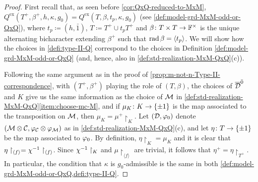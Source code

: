 \begin{proof}
    First recall that, as seen before \cref{cor:QxQ-reduced-to-MxM}, $Q^{\mathrm{ex}}(T^+, \beta^+, h, \kappa, g_0) = Q^{\mathrm{ex}} (T, \beta, t_p, \kappa, g_0)$ (see \cref{def:model-grd-MxM-odd-or-QxQ}), where $t_p \coloneqq (h, \bar 1)$, $T \coloneqq T^+ \cup t_p T^+$ and $\beta\colon T\times T \to \mathbb{F}^\times$ is the unique alternating bicharacter extending $\beta^+$ such that $\operatorname{rad} \beta = \langle t_p \rangle$. 
    We will show how the choices in \cref{defi:type-II-Q} correspond to the choices in Definition \ref{def:model-grd-MxM-odd-or-QxQ} (and, hence, also in \cref{def:std-realization-MxM-QxQ}(c)).
    
    Following the same argument as in the proof of \cref{prop:m-not-n-Type-II-correspondence}, with $(T^+, \beta^+)$ playing the role of $(T, \beta)$, the choices of $\barr \D\even$ and $K$ give us the same information as the choice of $\mathcal M$ in \cref{def:std-realization-MxM-QxQ}\eqref{item:choose-mc-M}, and if $\mu_K\colon K \to \{ \pm 1 \}$ is the map associated to the transposition on $\mathcal M$, then $\mu_K = \mu^+\restriction_K$. 
    Let $(\mathcal{D}, \varphi_0)$ denote $(\mathcal M \otimes \mathcal C, \varphi_{\mathcal C} \otimes \varphi_{\mathcal M})$ as in \cref{def:std-realization-MxM-QxQ}(c), and let
    $\eta\colon T \to \{ \pm 1 \}$ be the map associated to $\varphi_0$.  
    By definition, $\eta\restriction_{K} = \mu_K$ and it is clear that $\eta\restriction_{\langle f \rangle} = \chi^{-1}\restriction_{\langle f \rangle}$. %
    Since $\chi^{-1}\restriction_K$ and $\mu\restriction_{\langle f \rangle}$ are trivial, it follows that $\eta^+ = \eta\restriction_{T^+}$. 
    In particular, the condition that $\kappa$ is $g_0$-admissible is the same in both \cref{def:model-grd-MxM-odd-or-QxQ,defi:type-II-Q}. 
    
    

\end{proof}
